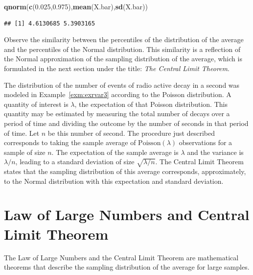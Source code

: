 \documentclass[]{krantz}
\makeatletter
\newenvironment{Shaded}{\begin{snugshade}}{\end{snugshade}}
\newcommand{\FloatTok}[1]{\textcolor[rgb]{0.00,0.00,0.81}{#1}}
\newcommand{\KeywordTok}[1]{\textcolor[rgb]{0.13,0.29,0.53}{\textbf{#1}}}
\newcommand{\NormalTok}[1]{#1}
\newenvironment{kframe}{%
\medskip{}
\setlength{\fboxsep}{.8em}
 \def\at@end@of@kframe{}%
 \ifinner\ifhmode%
  \def\at@end@of@kframe{\end{minipage}}%
  \begin{minipage}{\columnwidth}%
 \fi\fi%
 \def\FrameCommand##1{\hskip\@totalleftmargin \hskip-\fboxsep
 \colorbox{shadecolor}{##1}\hskip-\fboxsep
     \hskip-\linewidth \hskip-\@totalleftmargin \hskip\columnwidth}%
 \MakeFramed {\advance\hsize-\width
   \@totalleftmargin\z@ \linewidth\hsize
   \@setminipage}}%
 {\par\unskip\endMakeFramed%
 \at@end@of@kframe}
\renewenvironment{Shaded}{\begin{kframe}}{\end{kframe}}
\theoremstyle{definition}
\theoremstyle{definition}
\theoremstyle{definition}
\theoremstyle{remark}
\let\BeginKnitrBlock\begin \let\EndKnitrBlock\end
\makeatother
\begin{document}
\begin{Shaded}
\begin{Highlighting}[]
\KeywordTok{qnorm}\NormalTok{(}\KeywordTok{c}\NormalTok{(}\FloatTok{0.025}\NormalTok{,}\FloatTok{0.975}\NormalTok{),}\KeywordTok{mean}\NormalTok{(X.bar),}\KeywordTok{sd}\NormalTok{(X.bar))}
\end{Highlighting}
\end{Shaded}

\begin{verbatim}
## [1] 4.6130685 5.3903165
\end{verbatim}

Observe the similarity between the percentiles of the distribution of
the average and the percentiles of the Normal distribution. This
similarity is a reflection of the Normal approximation of the sampling
distribution of the average, which is formulated in the next section
under the title: \emph{The Central Limit Theorem}.

\BeginKnitrBlock{example}
\protect\hypertarget{exm:exsampdist3}{}{\label{exm:exsampdist3} }The distribution of the number of events of radio
active decay in a second was modeled in Example~\ref{exm:exrvar3}
according to the Poisson distribution. A quantity of interest is
\(\lambda\), the expectation of that Poisson distribution. This quantity
may be estimated by measuring the total number of decays over a period
of time and dividing the outcome by the number of seconds in that period
of time. Let \(n\) be this number of second. The procedure just described
corresponds to taking the sample average of \(\mathrm{Poisson}(\lambda)\)
observations for a sample of size \(n\). The expectation of the sample
average is \(\lambda\) and the variance is \(\lambda/n\), leading to a
standard deviation of size \(\sqrt{\lambda/n}\). The Central Limit Theorem
states that the sampling distribution of this average corresponds,
approximately, to the Normal distribution with this expectation and
standard deviation.
\EndKnitrBlock{example}

\hypertarget{law-of-large-numbers-and-central-limit-theorem}{%
\section{Law of Large Numbers and Central Limit Theorem}\label{law-of-large-numbers-and-central-limit-theorem}}

The Law of Large Numbers and the Central Limit Theorem are mathematical
theorems that describe the sampling distribution of the average for
large samples.
\end{document}
